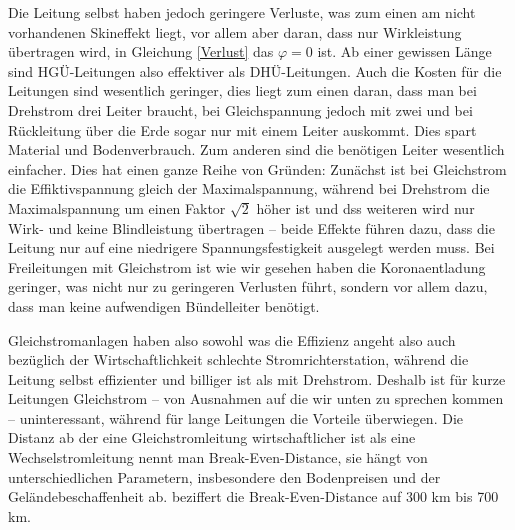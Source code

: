 \documentclass[10pt,a4paper]{article}
\begin{document}
Die Leitung selbst haben jedoch geringere Verluste, was zum einen am nicht vorhandenen Skineffekt liegt, vor allem aber daran, dass nur Wirkleistung übertragen wird, in Gleichung \ref{Verlust} das $\varphi=0$ ist. Ab einer gewissen Länge sind HGÜ-Leitungen also effektiver als DHÜ-Leitungen.
Auch die Kosten für die Leitungen sind wesentlich geringer, dies liegt zum einen daran, dass man bei Drehstrom drei Leiter braucht, bei Gleichspannung jedoch mit zwei und bei Rückleitung über die Erde sogar nur mit einem Leiter auskommt. Dies spart Material und Bodenverbrauch. %
Zum anderen sind die benötigen Leiter wesentlich einfacher. Dies hat einen ganze Reihe von Gründen:
Zunächst ist bei Gleichstrom die Effiktivspannung gleich der Maximalspannung, während bei Drehstrom die Maximalspannung um einen Faktor $\sqrt{2}$ höher ist und dss weiteren wird nur Wirk- und keine Blindleistung übertragen -- beide Effekte führen dazu, dass die Leitung nur auf eine niedrigere Spannungsfestigkeit ausgelegt werden muss. %
Bei Freileitungen mit Gleichstrom ist wie wir gesehen haben die Koronaentladung geringer, was nicht nur zu geringeren Verlusten führt, sondern vor allem dazu, dass man keine aufwendigen Bündelleiter benötigt.

Gleichstromanlagen haben also sowohl was die Effizienz angeht also auch bezüglich der Wirtschaftlichkeit schlechte  Stromrichterstation, während die Leitung selbst effizienter und billiger ist als mit Drehstrom. Deshalb ist für kurze Leitungen Gleichstrom -- von Ausnahmen auf die wir unten zu sprechen kommen -- uninteressant, während für lange Leitungen die Vorteile überwiegen. Die Distanz ab der eine Gleichstromleitung wirtschaftlicher ist als eine Wechselstromleitung nennt man Break-Even-Distance, sie hängt von unterschiedlichen Parametern, insbesondere den Bodenpreisen und der Geländebeschaffenheit ab. %
\cite{Schymroch} beziffert die Break-Even-Distance auf 300 km bis 700 km. %


\end{document}
